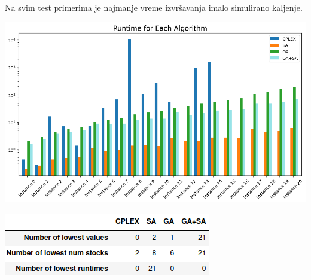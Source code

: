 \documentclass[12pt, a4paper]{article}
\begin{document}
Na svim test primerima je najmanje vreme izvršavanja imalo simulirano kaljenje.

\vspace{0.5cm}
\begin{center}
  \hspace{1cm}
  \includegraphics[width=\linewidth]{img/comparison_runtime.png}
  \hspace{1cm} 
\end{center}
\vspace{0.5cm}

\vspace{0.5cm}
\begin{center}
  \hspace{1cm}
  \includegraphics[width=0.6\linewidth]{img/comparison_table.png}
  \hspace{1cm} 
\end{center}
\vspace{0.5cm}
\end{document}
